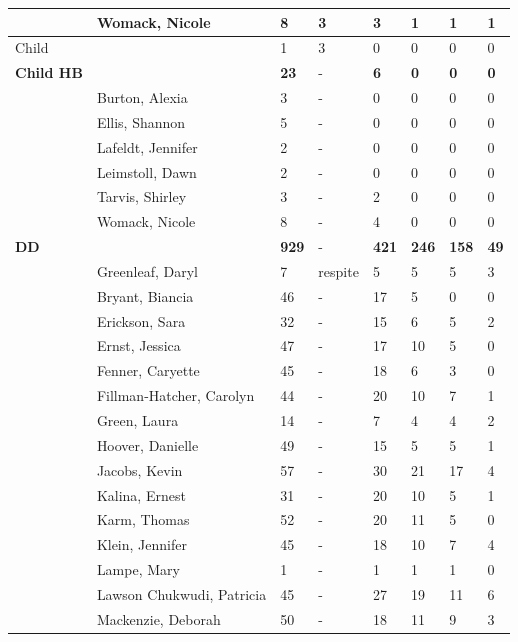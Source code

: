 \documentclass{article}\usepackage[]{graphicx}\usepackage[]{color}
\begin{document}
{\begin{longtable} { >{\raggedright}p{}p{}p{}p{}p{}p{}p{}p{}}
   & Womack, Nicole & 8 & 3 & 3 & 1 & 1 & 1 \\ 
   \hline
Child &  & 1 & 3 & 0 & 0 & 0 & 0 \\ 
   \hline
\textbf{Child HB} &  & \textbf{23} & - & \textbf{6} & \textbf{0} & \textbf{0} & \textbf{0} \\ 
   \rowcolor[gray]{0.90} & Burton, Alexia & 3 & - & 0 & 0 & 0 & 0 \\ 
   \rowcolor[gray]{0.90} & Ellis, Shannon & 5 & - & 0 & 0 & 0 & 0 \\ 
   & Lafeldt, Jennifer & 2 & - & 0 & 0 & 0 & 0 \\ 
   & Leimstoll, Dawn & 2 & - & 0 & 0 & 0 & 0 \\ 
   & Tarvis, Shirley & 3 & - & 2 & 0 & 0 & 0 \\ 
   \rowcolor[gray]{0.90} & Womack, Nicole & 8 & - & 4 & 0 & 0 & 0 \\ 
   \hline
\textbf{DD} &  & \textbf{929} & - & \textbf{421} & \textbf{246} & \textbf{158} & \textbf{49} \\ 
   \rowcolor[gray]{0.90} & Greenleaf, Daryl & 7 & respite & 5 & 5 & 5 & 3 \\ 
   & Bryant, Biancia & 46 & - & 17 & 5 & 0 & 0 \\ 
   & Erickson, Sara & 32 & - & 15 & 6 & 5 & 2 \\ 
   & Ernst, Jessica & 47 & - & 17 & 10 & 5 & 0 \\ 
   \rowcolor[gray]{0.90} & Fenner, Caryette & 45 & - & 18 & 6 & 3 & 0 \\ 
   \rowcolor[gray]{0.90} & Fillman-Hatcher, Carolyn & 44 & - & 20 & 10 & 7 & 1 \\ 
   \rowcolor[gray]{0.90} & Green, Laura & 14 & - & 7 & 4 & 4 & 2 \\ 
   & Hoover, Danielle & 49 & - & 15 & 5 & 5 & 1 \\ 
   & Jacobs, Kevin & 57 & - & 30 & 21 & 17 & 4 \\ 
   & Kalina, Ernest & 31 & - & 20 & 10 & 5 & 1 \\ 
   \rowcolor[gray]{0.90} & Karm, Thomas & 52 & - & 20 & 11 & 5 & 0 \\ 
   \rowcolor[gray]{0.90} & Klein, Jennifer & 45 & - & 18 & 10 & 7 & 4 \\ 
   \rowcolor[gray]{0.90} & Lampe, Mary & 1 & - & 1 & 1 & 1 & 0 \\ 
   & Lawson Chukwudi, Patricia & 45 & - & 27 & 19 & 11 & 6 \\ 
   & Mackenzie, Deborah & 50 & - & 18 & 11 & 9 & 3 \\ 

\end{longtable}}
\end{document}
